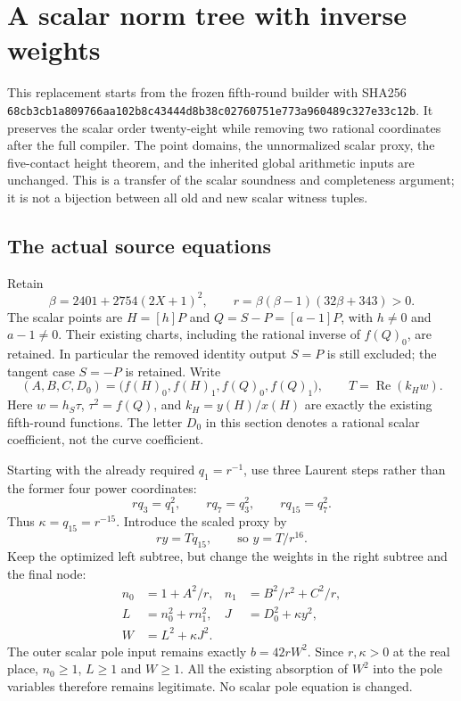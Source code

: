 \section{A scalar norm tree with inverse weights}

This replacement starts from the frozen fifth-round builder with SHA256
\texttt{68cb3cb1a809766aa102b8c43444d8b38c02760751e773a960489c327e33c12b}.
It preserves the scalar order twenty-eight while removing two rational
coordinates after the full compiler. The point domains, the unnormalized
scalar proxy, the five-contact height theorem, and the inherited global
arithmetic inputs are unchanged. This is a transfer of the scalar
soundness and completeness argument; it is not a bijection between all
old and new scalar witness tuples.

\subsection{The actual source equations}

Retain
\[
 \beta=2401+2754(2X+1)^2,\qquad
 r=\beta(\beta-1)(32\beta+343)>0.
\]
The scalar points are $H=[h]P$ and $Q=S-P=[a-1]P$, with
$h\ne0$ and $a-1\ne0$. Their existing charts, including the rational
inverse of $f(Q)_0$, are retained. In particular the removed identity
output $S=P$ is still excluded; the tangent case $S=-P$ is retained.
Write
\[
 (A,B,C,D_0)=\bigl(f(H)_0,f(H)_1,f(Q)_0,f(Q)_1\bigr),
 \qquad T=\operatorname{Re}(k_Hw).
\]
Here $w=h_S\tau$, $\tau^2=f(Q)$, and $k_H=y(H)/x(H)$ are exactly
the existing fifth-round functions. The letter $D_0$ in this section
denotes a rational scalar coefficient, not the curve coefficient.

Starting with the already required $q_1=r^{-1}$, use three Laurent
steps rather than the former four power coordinates:
\[
 rq_3=q_1^2,\qquad rq_7=q_3^2,\qquad rq_{15}=q_7^2.
\]
Thus $\kappa=q_{15}=r^{-15}$. Introduce the scaled proxy by
\[
 ry=Tq_{15},\qquad\text{so }y=T/r^{16}.
\]
Keep the optimized left subtree, but change the weights in the right
subtree and the final node:
\begin{align*}
 n_0&=1+A^2/r,&n_1&=B^2/r^2+C^2/r,\\
 L&=n_0^2+r n_1^2,&J&=D_0^2+\kappa y^2,\\
 W&=L^2+\kappa J^2.
\end{align*}
The outer scalar pole input remains exactly $b=42rW^2$.
Since $r,\kappa>0$ at the real place, $n_0\ge1$, $L\ge1$ and
$W\ge1$. All the existing absorption of $W^2$ into the pole variables
therefore remains legitimate. No scalar pole equation is changed.

